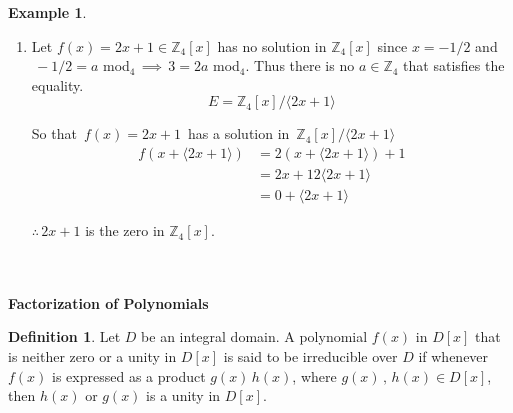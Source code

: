\documentclass[11pt,a4paper]{article}
\theoremstyle{definition}
\newtheorem{defn}[thm]{Definition}
\newtheorem{exa}[thm]{Example}
\begin{document}
\begin{exa}
\begin{enumerate}
or $\hspace{0.3cm} E = \mathbb{Z}_3[x]\big/\langle x^3 + 3x + 2\rangle$\\\\



\textit{Check}
\begin{align*}
f(x + \langle x^3 + 2x + 2\rangle) & = (x + \langle x^3 + 2x + 2\rangle)^5 - 2(x + \langle x^3 + 2x + 2\rangle)^2 + 2(x + \langle x^3 + 2x + 2\rangle) + 2\\
& = x^5 + \langle x^3 + 2x + 2\rangle^5 - 2x^2 - \cancel{2\langle x^3 + 2x + 2\rangle^2} + 2x + \cancel{2\langle x^3 + 2x + 2\rangle^2} + 2\\
& = x^5 - 2x^2 + 2x + 2 + \langle x^3 + 2x + 2\rangle\\
& = (x^2 + 1)(x^3 + 2x + 2) + \langle x^3 + 2x + 2\rangle\\
\end{align*}



\item Let $f(x) = 2x + 1 \in \mathbb{Z}_4[x]$ has no solution in $\mathbb{Z}_4[x]$ since $x = -1/2$ and\\ $\, -1/2 = a$ mod$_4 \, \implies \, 3 = 2a$ mod$_4$. Thus there is no $a\in \mathbb{Z}_4$ that satisfies the equality.\\
$$E = \mathbb{Z}_4[x]\big/\langle 2x + 1\rangle$$

So that $\, f(x) = 2x + 1\, $ has a solution in $\, \mathbb{Z}_4[x]\big/\langle 2x + 1\rangle$
\begin{align*}
f(x  + \langle 2x + 1\rangle ) & = 2(x + \langle 2x + 1\rangle) + 1\\
& = 2x + 1 2\langle 2x + 1\rangle\\
& = 0 + \langle 2x + 1\rangle
\end{align*}

$\therefore\, 2x + 1$ is the  zero in $\mathbb{Z}_4[x]$.\\\\\\
\end{enumerate}





\pagebreak
\end{exa}
\textbf{Factorization of Polynomials}\\


\begin{defn}
Let $D$ be an integral domain. A polynomial $f(x)$ in $D[x]$ that is neither zero or a unity in $D[x]$ is said to be irreducible over $D$ if whenever $f(x)$ is expressed as a product $g(x)\, h(x)$, where $g(x)\, ,\, h(x)\in D[x]$, then $h(x)$ or $g(x)$ is a unity in $D[x]$.\\\\
\end{defn}
\end{document}
